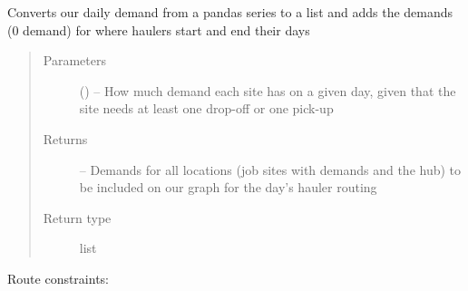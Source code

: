 \documentclass[letterpaper,10pt,english]{sphinxmanual}
\begin{document}
\begin{fulllineitems}
\label{\detokenize{daily-routing:parameters.make_demand_list}}
Converts our daily demand from a pandas series to a list and adds the
demands (0 demand) for where haulers start and end their days
\begin{quote}\begin{description}
\item[{Parameters}] \leavevmode
{} () -- How much demand each site has on a given day, given that the site
needs at least one drop-off or one pick-up

\item[{Returns}] \leavevmode
{} -- Demands for all locations (job sites with demands and the hub) to be
included on our graph for the day's hauler routing

\item[{Return type}] \leavevmode
list

\end{description}\end{quote}

\end{fulllineitems}


Route constraints:
\end{document}
